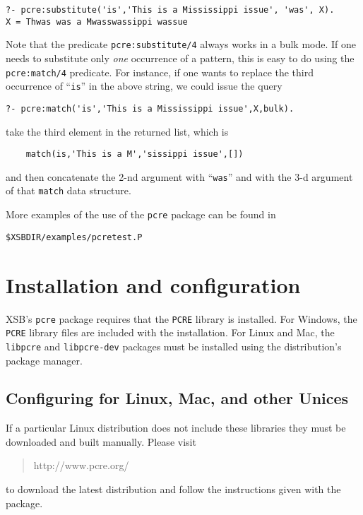 \begin{verbatim}
?- pcre:substitute('is','This is a Mississippi issue', 'was', X).
X = Thwas was a Mwasswassippi wassue
\end{verbatim}

Note that the predicate {\tt pcre:substitute/4} always works in a bulk
mode. If one needs to substitute only \emph{one} occurrence of a pattern,
this is easy to do using the {\tt pcre:match/4} predicate. For instance, if
one wants to replace the third occurrence of ``{\tt is}'' in the above
string, we could issue the query
\begin{verbatim}
?- pcre:match('is','This is a Mississippi issue',X,bulk).
\end{verbatim}
take the third element in the returned list, which is
\begin{verbatim}
    match(is,'This is a M','sissippi issue',[])
\end{verbatim}
and then concatenate the 2-nd argument with ``{\tt was}'' and with the 3-d
argument of that {\tt match} data structure. 

More examples of the use of the {\tt pcre} package can be found in 
\begin{verbatim}
$XSBDIR/examples/pcretest.P
\end{verbatim}


\section{Installation and configuration}

XSB's {\tt pcre} package requires that the {\tt PCRE} library is installed.
For Windows, the {\tt PCRE} library files are included with the
installation. For Linux and Mac, the {\tt libpcre} and {\tt libpcre-dev}
packages must be installed using the distribution's package manager.

\subsection{Configuring for Linux, Mac, and other Unices}

If a particular Linux distribution does not include these libraries they
must be downloaded and built manually. Please visit 
\begin{quote}
http://www.pcre.org/ 
\end{quote}
to download the latest distribution and follow the instructions given with
the package.

